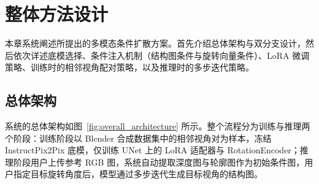 \chapter{整体方法设计}

本章系统阐述所提出的多模态条件扩散方案。首先介绍总体架构与双分支设计，然后依次详述底模选择、条件注入机制（结构图条件与旋转向量条件）、LoRA 微调策略、训练时的相邻视角配对策略，以及推理时的多步迭代策略。

\section{总体架构}

系统的总体架构如图~\ref{fig:overall_architecture} 所示。整个流程分为训练与推理两个阶段：训练阶段以 Blender 合成数据集中的相邻视角对为样本，冻结 InstructPix2Pix 底模，仅训练 UNet 上的 LoRA 适配器与 RotationEncoder；推理阶段用户上传参考 RGB 图，系统自动提取深度图与轮廓图作为初始条件图，用户指定目标旋转角度后，模型通过多步迭代生成目标视角的结构图。

